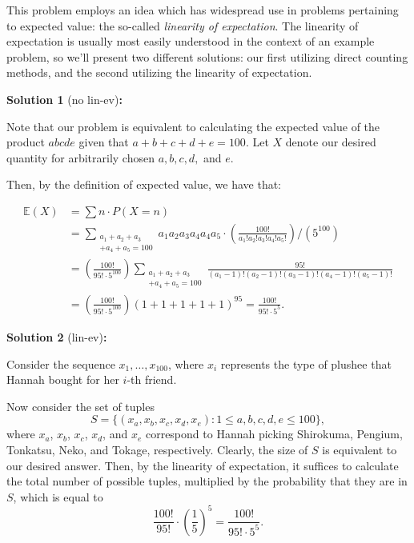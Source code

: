 This problem employs an idea which has widespread use in problems pertaining to expected value: the so-called \textit{linearity of expectation}. The linearity of expectation is usually most easily understood in the context of an example problem, so we'll present two different solutions: our first utilizing direct counting methods, and the second utilizing the linearity of expectation.\V

\begin{solution}
\textbf{Solution 1} (no lin-ev)\textbf{:}\V

Note that our problem is equivalent to calculating the expected value of the product $abcde$ given that $a+b+c+d+e=100$. Let $X$ denote our desired quantity for arbitrarily chosen $a,b,c,d,$ and $e$.\V

Then, by the definition of expected value, we have that:

\begin{align*}
    \mathbb{E}(X) &= \sum n\cdot P(X=n) \\
    &= \sum_{\substack{a_1+a_2+a_3 \\ +a_4+a_5=100}} a_1a_2a_3a_4a_4a_5\cdot \left(\frac{100!}{a_1!a_2!a_3!a_4!a_5!}\right)/(5^{100}) \\
    &= \left(\frac{100!}{95!\cdot 5^{100}}\right)\sum_{\substack{a_1+a_2+a_3 \\ +a_4+a_5=100}}\frac{95!}{(a_1-1)!(a_2-1)!(a_3-1)!(a_4-1)!(a_5-1)!} \\
    &= \left(\frac{100!}{95!\cdot 5^{100}}\right)(1+1+1+1+1)^{95} = \boxed{\frac{100!}{95!\cdot 5^5}}.
\end{align*}
\end{solution}\V

\begin{solution}
\textbf{Solution 2} (lin-ev)\textbf{:}\V

Consider the sequence $x_1, \hdots, x_{100}$, where $x_i$ represents the type of plushee that Hannah bought for her $i$-th friend. \V

Now consider the set of tuples
\[S = \{(x_a, x_b, x_c, x_d, x_e): 1\leq a,b,c,d,e\leq 100\},\]
where $x_a$, $x_b$, $x_c$, $x_d$, and $x_e$ correspond to Hannah picking Shirokuma, Pengium, Tonkatsu, Neko, and Tokage, respectively. Clearly, the size of $S$ is equivalent to our desired answer. Then, by the linearity of expectation, it suffices to calculate the total number of possible tuples, multiplied by the probability that they are in $S$, which is equal to 
\[\frac{100!}{95!}\cdot \left(\frac{1}{5}\right)^5 = \boxed{\frac{100!}{95!\cdot 5^5}}.\]
\end{solution}
